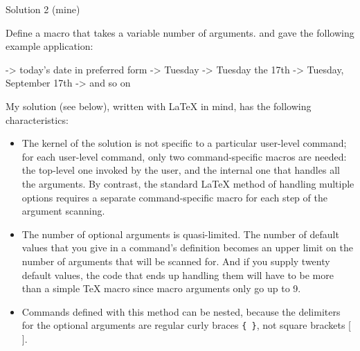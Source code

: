 \begin{solution}{Solution 2 (mine)}



Define a macro that takes a variable number of arguments. 
and gave the following example application: 
\begin{lcode}
\printdate                       -> today's date in preferred form 
\printdate[Tuesday]              -> Tuesday
\printdate[Tuesday][17]          -> Tuesday the 17th
\printdate[Tuesday][17][9]       -> Tuesday, September 17th
\printdate[Tuesday][17][9][2002] -> and so on 
\end{lcode}

My solution (see below), written with LaTeX in mind, has the 
            following characteristics: 
\begin{itemize}
\item The kernel of the solution is not specific to a particular 
            user-level command; for each user-level command, only two 
            command-specific macros are needed: the top-level one invoked by 
            the user, and the internal one that handles all the arguments. 
            By contrast, the standard LaTeX method of handling multiple 
            options requires a separate command-specific macro for each step 
            of the argument scanning. 
\item The number of optional arguments is quasi-limited. The number 
            of default values that you give in a command's definition 
            becomes an upper limit on the number of arguments that will be 
            scanned for. And if you supply twenty default values, the code 
            that ends up handling them will have to be more than a simple 
            TeX macro since macro arguments only go up to 9. 
\item Commands defined with this method can be nested, because the 
            delimiters for the optional arguments are regular curly braces \verb?{ }?,
            not square brackets [ ]. 
            
\end{itemize}


\end{solution}
